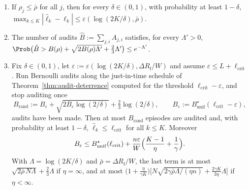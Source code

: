 \begin{theorem}\label{thm:audit-random}
\begin{enumerate}
\item[\textup{(a)}] If $\rho_j\le\bar\rho$ for all $j$, then for every
$\delta\in(0,1)$, with probability at least $1-\delta$,
$\max_{k\le K}|\hat\ell_k-\ell_k|\le\varepsilon(\log(2K/\delta),\bar\rho)$.
\item[\textup{(b)}] The number of audits $\hat B:=\sum_{j,i}A_{j,i}$ satisfies, for
every $\Lambda'>0$,
$\Prob\bigl(\hat B>B(\rho)+\sqrt{2B(\rho)\Lambda'}+\tfrac23\Lambda'\bigr)\le e^{-\Lambda'}$.
\item[\textup{(c)}] Fix $\delta\in(0,1)$, let
$\varepsilon:=\varepsilon(\log(2K/\delta),\Delta R_{\mathrm f}/W)$ and assume
$\varepsilon\le L+\ell_{\mathrm{crit}}$. Run Bernoulli audits along the
just-in-time schedule of Theorem~\ref{thm:audit-deterrence} computed for the
threshold $\ell_{\mathrm{crit}}-\varepsilon$, and stop auditing once
\[
  B_{\mathrm{rand}}:=B_\varepsilon+\sqrt{2B_\varepsilon\log(2/\delta)}+\tfrac23\log(2/\delta),
  \qquad B_\varepsilon:=B^\star_{\mathrm{unif}}(\ell_{\mathrm{crit}}-\varepsilon),
\]
audits have been made. Then at most $B_{\mathrm{rand}}$ episodes are audited
and, with probability at least $1-\delta$,
$\hat\ell_k\le\ell_{\mathrm{crit}}$ for all $k\le K$. Moreover
\begin{equation}\label{eq:audit-inflation}
  B_\varepsilon\le B^\star_{\mathrm{unif}}(\ell_{\mathrm{crit}})
  +\frac{n\varepsilon}{W}\Bigl(\frac{K-1}{\eta}+\frac1\gamma\Bigr).
\end{equation}
With $\Lambda=\log(2K/\delta)$ and $\bar\rho=\Delta R_{\mathrm f}/W$, the last term is at
most $\sqrt{2\bar\rho\,N\Lambda}+\tfrac23\Lambda$ if $\eta=\infty$, and at most
$\bigl(1+\tfrac{\eta}{\gamma K}\bigr)\bigl[N\sqrt{2\gamma\bar\rho\Lambda/(\eta n)}
+\tfrac{2\gamma K}{3\eta}\Lambda\bigr]$ if $\eta<\infty$.
\end{enumerate}
\end{theorem}

